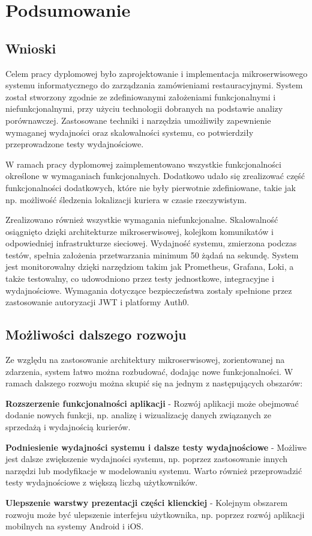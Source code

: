 \clearpage %

\section{Podsumowanie}

\subsection{Wnioski}

Celem pracy dyplomowej było zaprojektowanie i implementacja mikroserwisowego systemu informatycznego do zarządzania zamówieniami restauracyjnymi. System został stworzony zgodnie ze zdefiniowanymi założeniami funkcjonalnymi i niefunkcjonalnymi, przy użyciu technologii dobranych na podstawie analizy porównawczej. Zastosowane techniki i narzędzia umożliwiły zapewnienie wymaganej wydajności oraz skalowalności systemu, co potwierdziły przeprowadzone testy wydajnościowe.

W ramach pracy dyplomowej zaimplementowano wszystkie funkcjonalności określone w wymaganiach funkcjonalnych. Dodatkowo udało się zrealizować część funkcjonalności dodatkowych, które nie były pierwotnie zdefiniowane, takie jak np. możliwość śledzenia lokalizacji kuriera w czasie rzeczywistym.

Zrealizowano również wszystkie wymagania niefunkcjonalne. Skalowalność osiągnięto dzięki architekturze mikroserwisowej, kolejkom komunikatów i odpowiedniej infrastrukturze sieciowej. Wydajność systemu, zmierzona podczas testów, spełnia założenia przetwarzania minimum 50 żądań na sekundę. System jest monitorowalny dzięki narzędziom takim jak Prometheus, Grafana, Loki, a także testowalny, co udowodniono przez testy jednostkowe, integracyjne i wydajnościowe. Wymagania dotyczące bezpieczeństwa zostały spełnione przez zastosowanie autoryzacji JWT i platformy Auth0.

\subsection{Możliwości dalszego rozwoju}

Ze względu na zastosowanie architektury mikroserwisowej, zorientowanej na zdarzenia, system łatwo można rozbudować, dodając nowe funkcjonalności. W ramach dalszego rozwoju można skupić się na jednym z następujących obszarów:

\textbf{Rozszerzenie funkcjonalności aplikacji} - Rozwój aplikacji może obejmować dodanie nowych funkcji, np. analizę i wizualizację danych związanych ze sprzedażą i wydajnością kurierów.

\textbf{Podniesienie wydajności systemu i dalsze testy wydajnościowe} - Możliwe jest dalsze zwiększenie wydajności systemu, np. poprzez zastosowanie innych narzędzi lub modyfikacje w modelowaniu systemu. Warto również przeprowadzić testy wydajnościowe z większą liczbą użytkowników.

\textbf{Ulepszenie warstwy prezentacji części klienckiej} - Kolejnym obszarem rozwoju może być ulepszenie interfejsu użytkownika, np. poprzez rozwój aplikacji mobilnych na systemy Android i iOS.